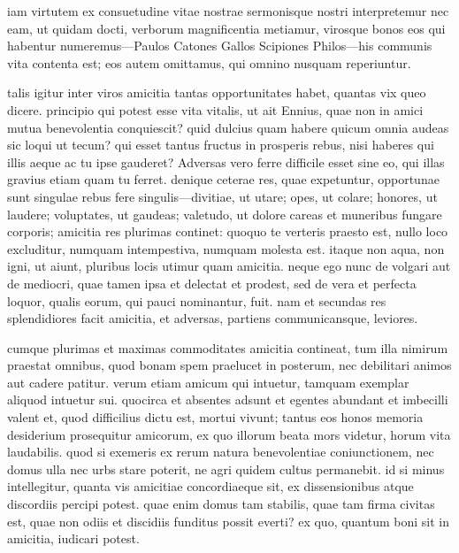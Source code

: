  iam virtutem ex consuetudine vitae nostrae sermonisque nostri interpretemur nec eam, ut quidam docti, verborum magnificentia metiamur, virosque bonos eos qui habentur numeremus—Paulos Catones Gallos Scipiones Philos—his communis vita contenta est; eos autem omittamus, qui omnino nusquam reperiuntur.

 talis igitur inter viros amicitia tantas opportunitates habet, quantas vix queo dicere. principio qui potest esse vita vitalis, ut ait Ennius, quae non in amici mutua benevolentia conquiescit? quid dulcius quam habere quicum omnia audeas sic loqui ut tecum? qui esset tantus fructus in prosperis rebus, nisi haberes qui illis aeque ac tu ipse gauderet? Adversas vero ferre difficile esset sine eo, qui illas gravius etiam quam tu ferret. denique ceterae res, quae expetuntur, opportunae sunt singulae rebus fere singulis—divitiae, ut utare; opes, ut colare; honores, ut laudere; voluptates, ut gaudeas; valetudo, ut dolore careas et muneribus fungare corporis; amicitia res plurimas continet: quoquo te verteris praesto est, nullo loco excluditur, numquam intempestiva, numquam molesta est. itaque non aqua, non igni, ut aiunt, pluribus locis utimur quam amicitia. neque ego nunc de volgari aut de mediocri, quae tamen ipsa et delectat et prodest, sed de vera et perfecta loquor, qualis eorum, qui pauci nominantur, fuit. nam et secundas res splendidiores facit amicitia, et adversas, partiens communicansque, leviores.

 cumque plurimas et maximas commoditates amicitia contineat, tum illa nimirum praestat omnibus, quod bonam spem praelucet in posterum, nec debilitari animos aut cadere patitur. verum etiam amicum qui intuetur, tamquam exemplar aliquod intuetur sui. quocirca et absentes adsunt et egentes abundant et imbecilli valent et, quod difficilius dictu est, mortui vivunt; tantus eos honos memoria desiderium prosequitur amicorum, ex quo illorum beata mors videtur, horum vita laudabilis. quod si exemeris ex rerum natura benevolentiae coniunctionem, nec domus ulla nec urbs stare poterit, ne agri quidem cultus permanebit. id si minus intellegitur, quanta vis amicitiae concordiaeque sit, ex dissensionibus atque discordiis percipi potest. quae enim domus tam stabilis, quae tam firma civitas est, quae non odiis et discidiis funditus possit everti? ex quo, quantum boni sit in amicitia, iudicari potest.

